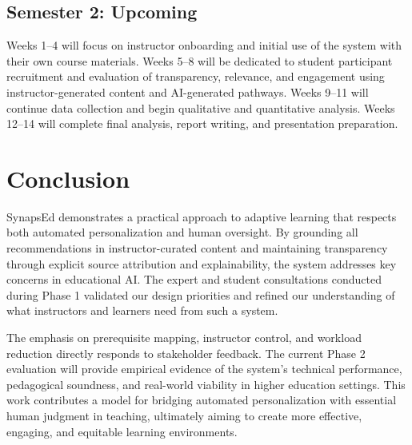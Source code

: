\documentclass{stylefiles/capstone}
\begin{document}
\subsection*{Semester 2: Upcoming}

Weeks 1--4 will focus on instructor onboarding and initial use of the system with their own course materials. Weeks 5--8 will be dedicated to student participant recruitment and evaluation of transparency, relevance, and engagement using instructor-generated content and AI-generated pathways. Weeks 9--11 will continue data collection and begin qualitative and quantitative analysis. Weeks 12--14 will complete final analysis, report writing, and presentation preparation.

\section{Conclusion}

SynapsEd demonstrates a practical approach to adaptive learning that respects both automated personalization and human oversight. By grounding all recommendations in instructor-curated content and maintaining transparency through explicit source attribution and explainability, the system addresses key concerns in educational AI. The expert and student consultations conducted during Phase 1 validated our design priorities and refined our understanding of what instructors and learners need from such a system.

The emphasis on prerequisite mapping, instructor control, and workload reduction directly responds to stakeholder feedback. The current Phase 2 evaluation will provide empirical evidence of the system's technical performance, pedagogical soundness, and real-world viability in higher education settings. This work contributes a model for bridging automated personalization with essential human judgment in teaching, ultimately aiming to create more effective, engaging, and equitable learning environments.



\end{document}
